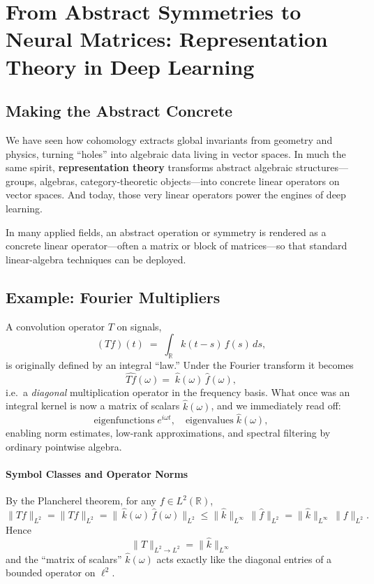 \section{From Abstract Symmetries to Neural Matrices: Representation Theory in Deep Learning}

\subsection{Making the Abstract Concrete}

We have seen how cohomology extracts global invariants from geometry and physics, turning “holes” into algebraic data living in vector spaces.  In much the same spirit, \textbf{representation theory} transforms abstract algebraic structures—groups, algebras, category‐theoretic objects—into concrete linear operators on vector spaces.  And today, those very linear operators power the engines of deep learning.

In many applied fields, an abstract operation or symmetry is rendered as a concrete linear operator—often a matrix or block of matrices—so that standard linear-algebra techniques can be deployed.

\subsection{Example: Fourier Multipliers}  
A convolution operator \(T\) on signals,
\[
(Tf)(t)\;=\;\int_{\mathbb R}k(t-s)\,f(s)\,ds,
\]
is originally defined by an integral “law.”  Under the Fourier transform it becomes
\[
\widehat{Tf}(\omega)
=\;\widehat{k}(\omega)\,\widehat{f}(\omega),
\]
i.e.\ a \emph{diagonal} multiplication operator in the frequency basis.  What once was an integral kernel is now a matrix of scalars \(\widehat{k}(\omega)\), and we immediately read off:
\[
\text{eigenfunctions}\;e^{i\omega t},\quad
\text{eigenvalues}\;\widehat{k}(\omega),
\]
enabling norm estimates, low-rank approximations, and spectral filtering by ordinary pointwise algebra.


\paragraph{Symbol Classes and Operator Norms}
By the Plancherel theorem, for any \(f\in L^2(\mathbb R)\),
\[
\|Tf\|_{L^2}
= \|\widehat{Tf}\|_{L^2}
= \bigl\|\,\widehat{k}(\omega)\,\widehat{f}(\omega)\bigr\|_{L^2}
\le \|\widehat{k}\|_{L^\infty}\,\|\widehat{f}\|_{L^2}
= \|\widehat{k}\|_{L^\infty}\,\|f\|_{L^2}.
\]
Hence
\[
\|T\|_{L^2\to L^2}
= \|\widehat{k}\|_{L^\infty}
\]
and the “matrix of scalars” \(\widehat{k}(\omega)\) acts exactly like the diagonal entries of a bounded operator on \(\ell^2\).

